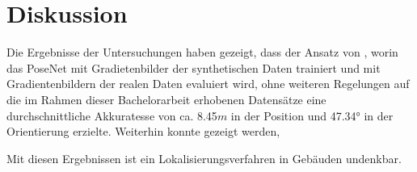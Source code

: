 
\section{Diskussion}
\label{sec:kapitel_5}

Die Ergebnisse der Untersuchungen haben gezeigt, dass der Ansatz von \citet{acharyaBIMPoseNetIndoorCamera2019}, worin das PoseNet mit Gradietenbilder der synthetischen Daten trainiert und mit Gradientenbildern der realen Daten evaluiert wird, ohne weiteren Regelungen auf die im Rahmen dieser Bachelorarbeit erhobenen Datensätze eine durchschnittliche Akkuratesse von ca. 8.45$m$ in der Position und 47.34° in der Orientierung erzielte. Weiterhin konnte gezeigt werden, 

 Mit diesen Ergebnissen ist ein Lokalisierungsverfahren in Gebäuden undenkbar.


 

% 




